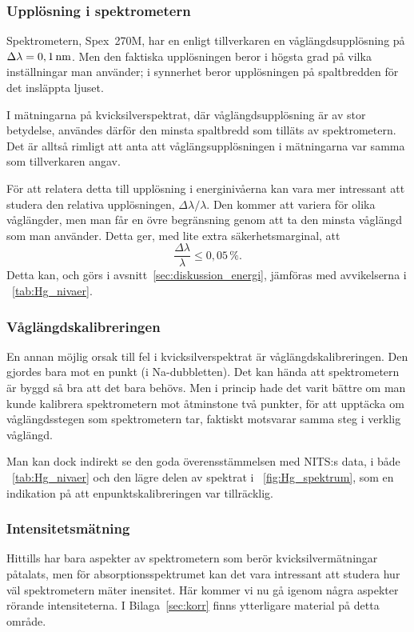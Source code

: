 \documentclass[11pt,a4paper]{article}
\newcommand{\figref}{\figurename~\ref}
\newcommand{\tabref}{\tablename~\ref} %
\begin{document}
\subsubsection{Upplösning i spektrometern}
\label{sec:diskussion_upplosning}
Spektrometern, Spex~270M, har en enligt tillverkaren \cite{Spex270M}
en våglängdsupplösning på $\Delta\lambda=\unit[0,1]{nm}$. Men den
faktiska upplösningen beror i högsta grad på vilka inställningar man
använder; i synnerhet beror upplösningen på spaltbredden för det
insläppta ljuset. 

I mätningarna på kvicksilverspektrat, där våglängdsupplösning är av
stor betydelse, användes därför den minsta spaltbredd som tilläts av
spektrometern. Det är alltså rimligt att anta att våglängsupplösningen
i mätningarna var samma som tillverkaren angav.

För att relatera detta till upplösning i energinivåerna\fotnotemark{}
kan vara mer intressant att studera den relativa upplösningen,
$\Delta\lambda/\lambda$. Den kommer att variera för olika våglängder,
men man får en övre begränsning genom att ta den minsta våglängd som
man använder. Detta ger, med lite extra säkerhetsmarginal, att 
\[ 
\frac{\Delta\lambda}{\lambda}\le 0,05\,\%. 
\]
Detta kan, och görs i avsnitt~\ref{sec:diskussion_energi}, jämföras
med avvikelserna i \tabref{tab:Hg_nivaer}.


\subsubsection{Våglängdskalibreringen}
En annan möjlig orsak till fel i kvicksilverspektrat är
våglängdskalibreringen. Den gjordes bara mot en punkt
(i Na-dubbletten). Det kan hända att spektrometern är byggd så bra att
det bara behövs. Men i princip hade det varit bättre om man kunde
kalibrera spektrometern mot åtminstone två punkter, för att upptäcka
om våglängdsstegen som spektrometern tar, faktiskt motsvarar samma
steg i verklig våglängd. 

Man kan dock indirekt se den goda överensstämmelsen med NITS:s data, i
både \tabref{tab:Hg_nivaer} och den lägre delen av spektrat i
\figref{fig:Hg_spektrum}, som en indikation på att enpunktskalibreringen
var tillräcklig.  

\subsubsection{Intensitetsmätning} 
Hittills har bara aspekter av spektrometern som berör
kvicksilvermätningar påtalats, men för absorptionsspektrumet kan det
vara intressant att studera hur väl spektrometern mäter inensitet. Här
kommer vi nu gå igenom några aspekter rörande intensiteterna. I
Bilaga~\ref{sec:korr} finns ytterligare material på detta område. 
\end{document}
